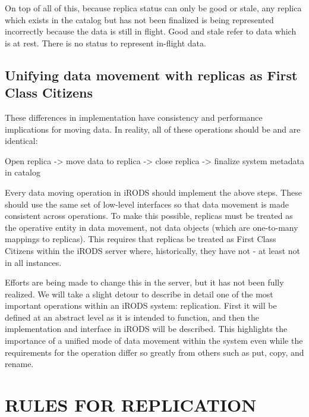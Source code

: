 \documentclass{irodsugm}
\begin{document}
On top of all of this, because replica status can only be good or stale, any replica which exists in the catalog but has not been finalized is being represented incorrectly because the data is still in flight. Good and stale refer to data which is at rest. There is no status to represent in-flight data.

\subsection*{Unifying data movement with replicas as First Class Citizens}

These differences in implementation have consistency and performance implications for moving data. In reality, all of these operations should be and are identical:

\begin{samepage}
\begin{center}
Open replica -> move data to replica -> close replica -> finalize system metadata in catalog
\end{center}
\end{samepage}

Every data moving operation in iRODS should implement the above steps. These should use the same set of low-level interfaces so that data movement is made consistent across operations. To make this possible, replicas must be treated as the operative entity in data movement, not data objects (which are one-to-many mappings to replicas). This requires that replicas be treated as First Class Citizens within the iRODS server where, historically, they have not - at least not in all instances.

Efforts are being made to change this in the server, but it has not been fully realized. We will take a slight detour to describe in detail one of the most important operations within an iRODS system: replication. First it will be defined at an abstract level as it is intended to function, and then the implementation and interface in iRODS will be described. This highlights the importance of a unified mode of data movement within the system even while the requirements for the operation differ so greatly from others such as put, copy, and rename.

\section*{RULES FOR REPLICATION}
\end{document}
